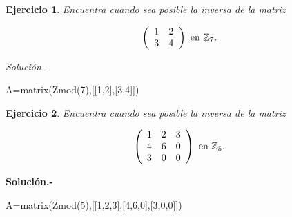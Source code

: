 \documentclass{amsart}
\newtheorem{ejer}{Ejercicio}
\def\z{\mathbb{Z}}
\begin{document}

\begin{ejer} Encuentra cuando sea posible la inversa de la matriz

\[ \left( \begin{array}{cc}
1 & 2 \\
3 & 4 \end{array} \right) \ \hbox{en} \ \z _{7}. \]

\end{ejer}

{\it Soluci\'on.- }

\begin{sageblock}
A=matrix(Zmod(7),[[1,2],[3,4]])
\end{sageblock}




\begin{ejer} Encuentra cuando sea posible la inversa de la matriz

\[ \left( \begin{array}{cccc}
1 & 2 & 3 \\
4 & 6 & 0 \\
3 & 0 & 0  \end{array} \right) \ \hbox{en} \ \z _{5}. \]

\end{ejer}
{\bf Solución.-}

\begin{sageblock}
A=matrix(Zmod(5),[[1,2,3],[4,6,0],[3,0,0]])
\end{sageblock}


\end{document}
